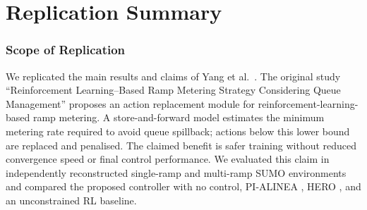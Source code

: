 
\section*{Replication Summary}

\subsubsection{Scope of Replication}

We replicated the main results and claims of Yang et al.~\cite{Yang2025Reinforcement}. The original study ``Reinforcement Learning–Based Ramp Metering Strategy Considering Queue Management'' proposes an action replacement module for reinforcement-learning-based ramp metering. A store-and-forward model estimates the minimum metering rate required to avoid queue spillback; actions below this lower bound are replaced and penalised. The claimed benefit is safer training without reduced convergence speed or final control performance. We evaluated this claim in independently reconstructed single-ramp and multi-ramp SUMO environments and compared the proposed controller with no control, PI-ALINEA \cite{wang2014local}, HERO \cite{Papamichail2010HERO}, and an unconstrained RL baseline.

